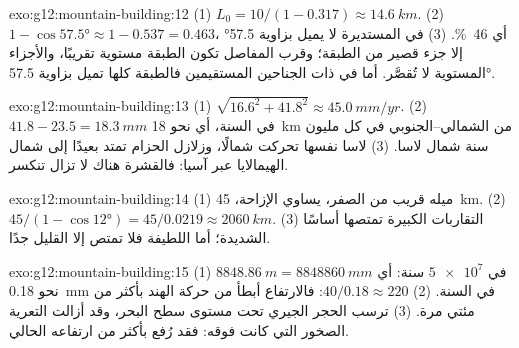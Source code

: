 \begin{solution}{exo:g12:mountain-building:12}
(1) $L_0 = 10/(1 - 0.317) \approx \qty{14.6}{km}$. (2) $1 - \cos\ang{57.5}
\approx 1 - 0.537 = 0.463$، أي \qty{46}{\percent}. (3) في  المستديرة
لا يميل بزاوية \ang{57.5} إلا جزء قصير من الطبقة؛ وقرب المفاصل تكون الطبقة
مستوية تقريبًا، والأجزاء المستوية لا تُقصَّر. أما في  ذات الجناحين المستقيمين
فالطبقة كلها تميل بزاوية \ang{57.5}.
\end{solution}

\begin{solution}{exo:g12:mountain-building:13}
(1) $\sqrt{16.6^2 + 41.8^2} \approx \qty{45.0}{mm/yr}$. (2) $41.8 - 23.5 =
\qty{18.3}{mm}$ في السنة، أي نحو \qty{18}{km} من  الشمالي--الجنوبي
في كل مليون سنة شمال لاسا. (3) لاسا نفسها تحركت شمالًا،
وزلازل الحزام تمتد بعيدًا إلى شمال الهيمالايا عبر آسيا: فالقشرة
هناك لا تزال تنكسر.
\end{solution}

\begin{solution}{exo:g12:mountain-building:14}
(1) ميله قريب من الصفر،  يساوي الإزاحة،
\qty{45}{km}. (2) $45/(1 - \cos\ang{12}) = 45/0.0219 \approx \qty{2060}{km}$.
(3) التقاربات الكبيرة تمتصها أساسًا   
الشديدة؛ أما  اللطيفة فلا تمتص إلا القليل جدًا.
\end{solution}

\begin{solution}{exo:g12:mountain-building:15}
(1) $\qty{8848.86}{m} = \qty{8848860}{mm}$ في $\num{5e7}$ سنة: أي نحو
\qty{0.18}{mm} في السنة. (2) $40/0.18 \approx 220$: فالارتفاع أبطأ من حركة
الهند بأكثر من مئتي مرة. (3) ترسب الحجر الجيري
تحت مستوى سطح البحر، وقد أزالت التعرية الصخور التي كانت فوقه: فقد
رُفع بأكثر من ارتفاعه الحالي.
\end{solution}

